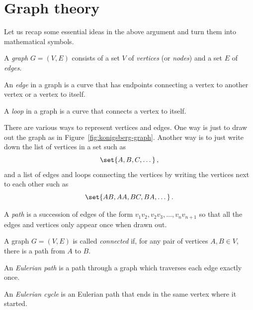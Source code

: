 \section{Graph theory}

Let us recap some essential ideas in the above argument 
and turn them into mathematical symbols.
\begin{definition}[Graph]
    A \emph{graph} $G = (V,E)$ consists of a set $V$ of \emph{vertices} (or \emph{nodes})    
    and a set $E$ of \emph{edges}.
    
    An \emph{edge} in a graph is a curve that has endpoints connecting a vertex to another 
    vertex or a vertex to itself.
    
    A \emph{loop} in a graph is a curve that connects a vertex to itself.
\end{definition}

There are various ways to represent vertices and edges. One way is just to draw out
the graph as in Figure~\ref{fig:konigsberg-graph}.
Another way is to just write down the list of vertices in a set such as
\begin{equation*}
    \set{A,B,C,\dots} \,,
\end{equation*}
and a list of edges and loops connecting the vertices by writing the vertices next to each other such as
\begin{equation*}
    \set{AB, AA, BC, BA, \dots} \,.
\end{equation*}

\begin{definition}[Path]
    A \emph{path} is a succession of edges of the form $v_1v_2,v_2v_3,\dots, v_n v_{n+1}$ so that
    all the edges and vertices only appear once when drawn out.
\end{definition}
\begin{definition}
    A graph $G = (V,E)$ is called \emph{connected} if, for any pair of vertices $A, B \in V$, there is a path from $A$ to $B$.
\end{definition}


\begin{definition}
    An \emph{Eulerian path} is a path through a graph which traverses each 
    edge exactly once.
\end{definition}

\begin{definition}
    An \emph{Eulerian cycle} is an Eulerian path that ends in the same vertex where it started.
\end{definition}


